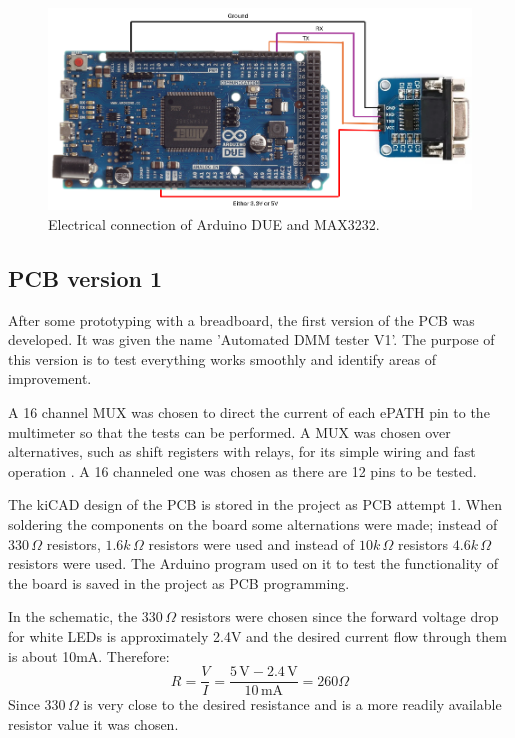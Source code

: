\begin{figure}[H]
          \centering
          \includegraphics[width=1\linewidth]{img/MAX3232_connection.png}
          \caption{Electrical connection of Arduino DUE and MAX3232.}
          \label{MAX3232_Arduino}
    \end{figure}


\subsection{PCB version 1}
After some prototyping with a breadboard, the first version of the PCB was developed. It was given the name 'Automated DMM tester V1'. The purpose of this version is to test everything works smoothly and identify areas of improvement. 

A 16 channel MUX was chosen to direct the current of each ePATH pin to the multimeter so that the tests can be performed. A MUX was chosen over alternatives, such as shift registers with relays, for its simple wiring and fast operation \cite{tiMAX3232guide}. A 16 channeled one was chosen as there are 12 pins to be tested.

The kiCAD design of the PCB is stored in the project as PCB attempt 1. When soldering the components on the board some alternations were made; instead of $330\,\Omega$ resistors, $1.6k\,\Omega$ resistors were used and instead of $10k\,\Omega$ resistors $4.6k\,\Omega$ resistors were used. The Arduino program used on it to test the functionality of the board is saved in the project as PCB programming. 

In the schematic, the $330\,\Omega$ resistors were chosen since the forward voltage drop for white LEDs is approximately 2.4V and the desired current flow through them is about 10mA. Therefore:
\[
R = \frac{V}{I} = \frac{5\,\mathrm{V} - 2.4\,\mathrm{V}}{10\,\mathrm{mA}}=260\Omega
\]
Since $330\,\Omega$ is very close to the desired resistance and is a more readily available resistor value it was chosen.


